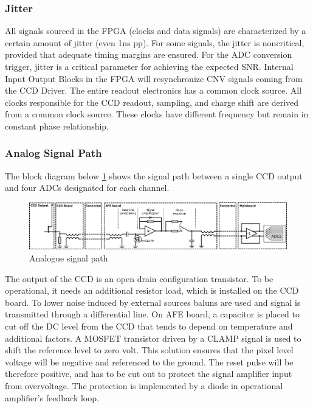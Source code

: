 \subsubsection{Jitter}
All signals sourced in the FPGA (clocks and data signals) are characterized by a certain amount of jitter (even 1ns pp). For some signals, the jitter is noncritical, provided that adequate timing margins are ensured. For the ADC conversion trigger, jitter is a critical parameter for achieving the expected SNR. Internal Input Output Blocks in the FPGA will resynchronize CNV signals coming from the CCD Driver. 
The entire readout electronics has a common clock source. All clocks responsible for the CCD readout, sampling, and charge shift are derived from a common clock source. These clocks have different frequency but remain in constant phase relationship.

\subsubsection{Analog Signal Path}

The block diagram below \ref{fig:analog} shows the signal path between a single CCD output and four ADCs designated for each channel. 
\begin{figure}[H]
\centering
\includegraphics[width=\textwidth]{pict/afe_schem.png}
\caption{Analogue signal path}
\label{fig:analog}
\end{figure}

The output of the CCD is an open drain configuration transistor. To be operational, it needs an additional resistor load, which is installed on the CCD board. To lower noise induced by external sources baluns are used and signal is transmitted through a differential line. On AFE board, a capacitor is placed to cut off the DC level from the CCD that tends to depend on temperature and additional factors. A MOSFET transistor driven by a CLAMP signal is used to shift the reference level to zero volt. This solution ensures that the pixel level voltage will be negative and referenced to the ground. The reset pulse will be therefore positive, and has to be cut out to protect the signal amplifier input from overvoltage. The protection is implemented by a diode in operational amplifier's feedback loop. \\

